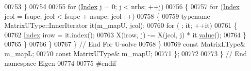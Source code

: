\begin{DoxyCode}
00753       \}
00754 
00755       \textcolor{keywordflow}{for} (\hyperlink{namespace_eigen_a62e77e0933482dafde8fe197d9a2cfde}{Index} j = 0; j < nrhs; ++j)
00756       \{
00757         \textcolor{keywordflow}{for} (\hyperlink{namespace_eigen_a62e77e0933482dafde8fe197d9a2cfde}{Index} jcol = fsupc; jcol < fsupc + nsupc; jcol++)
00758         \{
00759           \textcolor{keyword}{typename} MatrixUType::InnerIterator it(m\_mapU, jcol);
00760           \textcolor{keywordflow}{for} ( ; it; ++it)
00761           \{
00762             \hyperlink{namespace_eigen_a62e77e0933482dafde8fe197d9a2cfde}{Index} irow = it.index();
00763             X(irow, j) -= X(jcol, j) * it.\hyperlink{group___core___module_a8da735a6bfc7012606acf787156d10a0}{value}();
00764           \}
00765         \}
00766       \}
00767     \} \textcolor{comment}{// End For U-solve}
00768   \}
00769   \textcolor{keyword}{const} MatrixLType& m\_mapL;
00770   \textcolor{keyword}{const} MatrixUType& m\_mapU;
00771 \};
00772 
00773 \} \textcolor{comment}{// End namespace Eigen }
00774 
00775 \textcolor{preprocessor}{#endif}
\end{DoxyCode}
